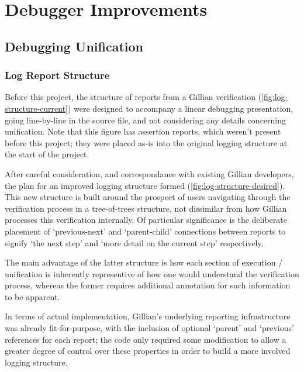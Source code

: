 




\chapter{Debugger Improvements}\label{sec:improvements}

\section{Debugging Unification}\label{sec:improvements:unification_debug}

\subsection{Log Report Structure}\label{sec:improvements:unification_debug:log_structure}

Before this project, the structure of reports from a Gillian verification
(\autoref{fig:log-structure-current}) were designed to accompany a linear
debugging presentation, going line-by-line in the source file, and not
considering any details concerning unification. Note that this figure has
assertion reports, which weren't present before this project; they were placed
as-is into the original logging structure at the start of the project.

After careful consideration, and correspondance with existing Gillian
developers, the plan for an improved logging structure formed
(\autoref{fig:log-structure-desired}). This new structure is built around the
prospect of users navigating through the verification process in a tree-of-trees
structure, not dissimilar from how Gillian processes this verification
internally. Of particular significance is the deliberate placement of
`previous-next' and `parent-child' connections between reports to signify
`the next step' and `more detail on the current step' respectively.

The main advantage of the latter structure is how each section of execution /
unification is inherently representive of how one would understand the
verification process, whereas the former requires additional annotation for
such information to be apparent.

In terms of actual implementation, Gillian's underlying reporting infrastructure
was already fit-for-purpose, with the inclusion of optional `parent' and
`previous' references for each report; the code only required some modification
to allow a greater degree of control over these properties in order to build a
more involved logging structure.

